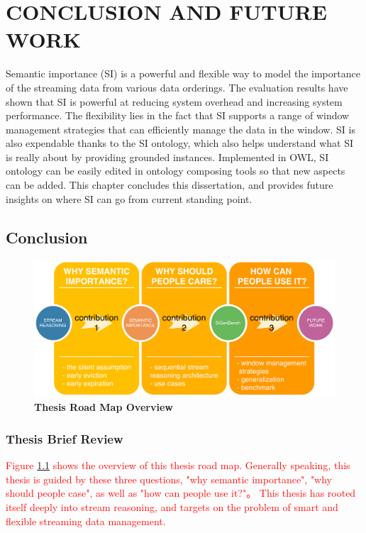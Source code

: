  
\chapter{CONCLUSION AND FUTURE WORK}
Semantic importance (SI) is a powerful and flexible way to model the importance of the streaming data from various data orderings.
The evaluation results have shown that SI is powerful at reducing system overhead and increasing system performance. 
The flexibility lies in the fact that SI supports a range of window management strategies that can efficiently manage the data in the window. 
SI is also expendable thanks to the SI ontology, which also helps understand what SI is really about by providing grounded instances.
Implemented in OWL, SI ontology can be easily edited in ontology composing tools so that new aspects can be added. 
This chapter concludes this dissertation, and provides future insights on where SI can go from current standing point. 
%
\section{Conclusion}

\begin{figure}[!htbp]
	\centering
    \includegraphics[width=5in]{img/7-trm.pdf}
    \caption{\textbf{Thesis Road Map Overview}}
    \label{fig:7-trm}
\end{figure}
%
\subsection{Thesis Brief Review}
\textcolor{red}{
Figure \ref{fig:7-trm} shows the overview of this thesis road map. 
Generally speaking, this thesis is guided by these three questions, 
"why semantic importance", "why should people case", as well as "how can people use it?"。
This thesis has rooted itself deeply into stream reasoning, and targets on the problem of smart and flexible streaming data management. 
}

